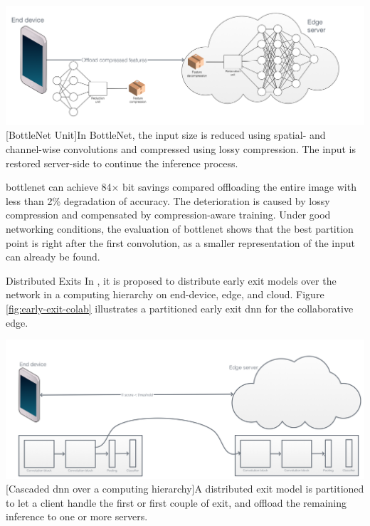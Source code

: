\begin{enumdescript}
	\begin{minipage}[t]{\linewidth}
		\centering
		\includegraphics[width=.8\linewidth]{figures/models/bottlenet}
		[BottleNet Unit]{In BottleNet, the input size is reduced using spatial- and channel-wise convolutions and compressed using lossy compression. The input is restored server-side to continue the inference process.}
	\end{minipage}
	
	\gls{bottlenet} can achieve 84$\times$ bit savings compared offloading the entire image with less than 2\% degradation of accuracy. The deterioration is caused by lossy compression and compensated by compression-aware training. Under good networking conditions, the evaluation of \gls{bottlenet} shows that the best partition point is right after the first convolution, as a smaller representation of the input can already be found. 	
	\item[Distributed Exits] In \cite{leroux_cascading_2017,teerapittayanon_distributed_2017}, it is proposed to distribute early exit models over the network in a computing hierarchy on end-device, edge, and cloud. Figure \ref{fig:early-exit-colab} illustrates a partitioned early exit \gls{dnn} for the collaborative edge. 
	
	\begin{minipage}[t]{\linewidth}
		\centering
		\includegraphics[width=\linewidth]{figures/models/cascaded}
		[Cascaded \gls{dnn} over a computing hierarchy]{A distributed exit model is partitioned to let a client handle the first or first couple of exit, and offload the remaining inference to one or more servers.}
		\label{fig:early-exit-colab}
	\end{minipage}


\end{enumdescript}

